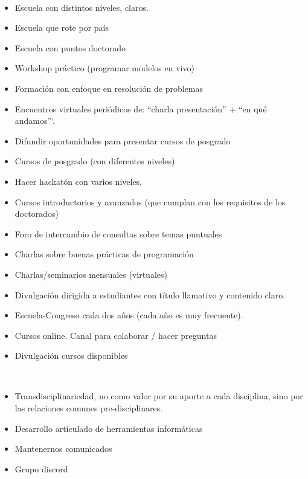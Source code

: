 \documentclass[a4paper,11pt]{book}
\theoremstyle{definition}
\begin{document}

\begin{description}\setlength\itemsep{0cm}
\item[Formación teórica y práctica:] \phantom{.} \\[-0.7cm]
\begin{itemize} \setlength\itemsep{0cm}
\item Escuela con distintos niveles, claros.
\item Escuela que rote por país
\item Escuela con puntos doctorado
\item Workshop práctico (programar modelos en vivo)
\item Formación con enfoque en resolución de problemas
\item Encuentros virtuales periódicos de: ``charla presentación'' + ``en qué andamos''`.
\item Difundir oportunidades para presentar cursos de posgrado
\item Cursos de posgrado (con diferentes niveles)
\item Hacer hackatón con varios niveles.
\item Cursos introductorios y avanzados (que cumplan con los requisitos de los doctorados)
\item Foro de intercambio de consultas sobre temas puntuales
\item Charlas sobre buenas prácticas de programación
\item Charlas/seminarios mensuales (virtuales)
\item Divulgación dirigida a estudiantes con título llamativo y contenido claro.
\item Escuela-Congreso cada dos años (cada año es muy frecuente).
\item Cursos online. Canal para colaborar / hacer preguntas
\item Divulgación cursos disponibles
\end{itemize}

\item[Colaboración:]\phantom{.} \\[-0.7cm]
\begin{itemize} \setlength\itemsep{0cm}
\item Transdisciplinariedad, no como valor por su aporte a cada disciplina, sino por las relaciones comunes pre-disciplinares.
\item Desarrollo articulado de herramientas informáticas
\item Mantenernos comunicados
\item Grupo discord
\end{itemize}


\end{description}
\end{document}
